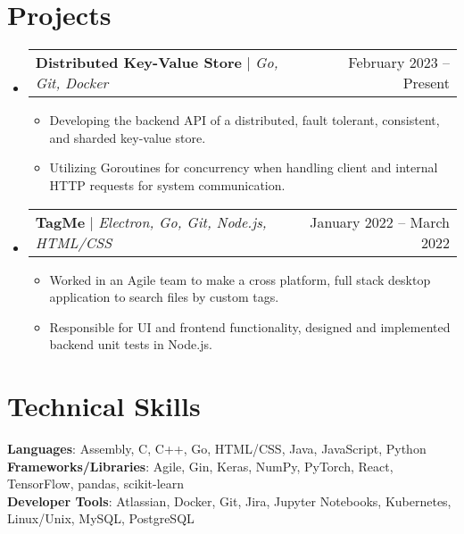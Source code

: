 \documentclass[letterpaper,11pt]{article}
\makeatletter
\newcommand{\resumeItem}[1]{
    \item\small{
      {#1 \vspace{-2pt}}
    }
  }
\newcommand{\resumeProjectHeading}[2]{
      \item
      \begin{tabular*}{0.97\textwidth}{l@{\extracolsep{\fill}}r}
        \small#1 & #2 \\
      \end{tabular*}\vspace{-7pt}
  }
\newcommand{\resumeSubHeadingListStart}{\begin{itemize}[leftmargin=0.15in, label={}]}
\newcommand{\resumeSubHeadingListEnd}{\end{itemize}}
\newcommand{\resumeItemListStart}{\begin{itemize}}
\newcommand{\resumeItemListEnd}{\end{itemize}\vspace{-5pt}}
\makeatother
\begin{document}
\section{Projects}
  \resumeSubHeadingListStart

    \resumeProjectHeading{\textbf{Distributed Key-Value Store} $|$ \emph{Go, Git, Docker}}{February 2023 -- Present}
      \resumeItemListStart
        \resumeItem{Developing the backend API of a distributed, fault tolerant, consistent, and sharded key-value store.}
        \resumeItem{Utilizing Goroutines for concurrency when handling client and internal HTTP requests for system communication.}
      \resumeItemListEnd


    \resumeProjectHeading{\textbf{TagMe} $|$ \emph{Electron, Go, Git, Node.js, HTML/CSS}}{January 2022 -- March 2022}
      \resumeItemListStart
        \resumeItem{Worked in an Agile team to make a cross platform, full stack desktop application to search files by custom tags.}
        \resumeItem{Responsible for UI and frontend functionality, designed and implemented backend unit tests in Node.js.}
      \resumeItemListEnd

  \resumeSubHeadingListEnd

\section{Technical Skills}

  \begin{itemize}[leftmargin=0.15in, label={}]
    \small{\item{
      \textbf{Languages}{: Assembly, C, C++, Go, HTML/CSS, Java, JavaScript, Python} \\
      \textbf{Frameworks/Libraries}{: Agile, Gin, Keras, NumPy, PyTorch, React, TensorFlow, pandas, scikit-learn} \\
      \textbf{Developer Tools}{: Atlassian, Docker, Git, Jira, Jupyter Notebooks, Kubernetes, Linux/Unix, MySQL, PostgreSQL}}}
  \end{itemize}
\end{document}

